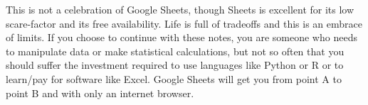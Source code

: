 This is not a celebration of Google Sheets, though Sheets is excellent for its low scare-factor and its free availability. Life is full of tradeoffs and this is an embrace of limits. If you choose to continue with these notes, you are someone who needs to manipulate data or make statistical calculations, but not so often that you should suffer the investment required to use languages like Python or R or to learn/pay for software like Excel. Google Sheets will get you from point A to point B and with only an internet browser. 